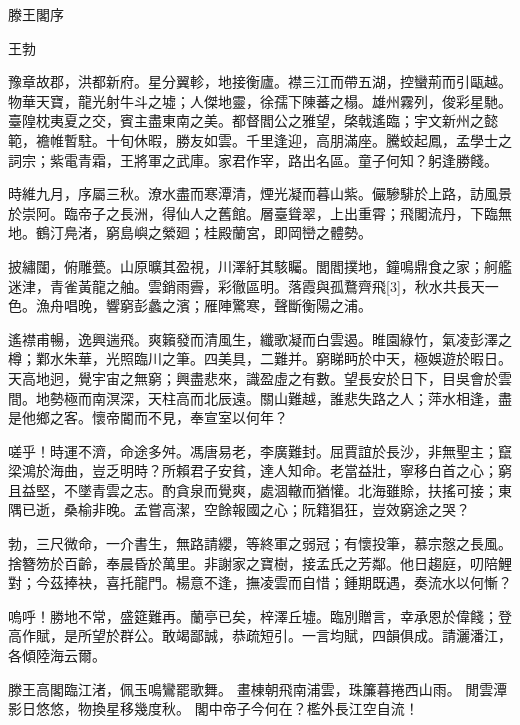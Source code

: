 滕王閣序

王勃

豫章故郡，洪都新府。星分翼軫，地接衡廬。襟三江而帶五湖，控蠻荊而引甌越。物華天寶，龍光射牛斗之墟；人傑地靈，徐孺下陳蕃之榻。雄州霧列，俊彩星馳。臺隍枕夷夏之交，賓主盡東南之美。都督閻公之雅望，棨戟遙臨；宇文新州之懿範，襜帷暫駐。十旬休暇，勝友如雲。千里逢迎，高朋滿座。騰蛟起鳳，孟學士之詞宗；紫電青霜，王將軍之武庫。家君作宰，路出名區。童子何知？躬逢勝餞。

時維九月，序屬三秋。潦水盡而寒潭清，煙光凝而暮山紫。儼驂騑於上路，訪風景於崇阿。臨帝子之長洲，得仙人之舊館。層臺聳翠，上出重霄；飛閣流丹，下臨無地。鶴汀鳧渚，窮島嶼之縈廻；桂殿蘭宮，即岡巒之體勢。

披繡闥，俯雕甍。山原曠其盈視，川澤紆其駭矚。閭閻撲地，鐘鳴鼎食之家；舸艦迷津，青雀黃龍之舳。雲銷雨霽，彩徹區明。落霞與孤鶩齊飛[3]，秋水共長天一色。漁舟唱晚，響窮彭蠡之濱；雁陣驚寒，聲斷衡陽之浦。

遙襟甫暢，逸興遄飛。爽籟發而清風生，纖歌凝而白雲遏。睢園綠竹，氣凌彭澤之樽；鄴水朱華，光照臨川之筆。四美具，二難并。窮睇眄於中天，極娛遊於暇日。天高地迥，覺宇宙之無窮；興盡悲來，識盈虛之有數。望長安於日下，目吳會於雲間。地勢極而南溟深，天柱高而北辰遠。關山難越，誰悲失路之人；萍水相逢，盡是他鄉之客。懷帝閽而不見，奉宣室以何年？

嗟乎！時運不濟，命途多舛。馮唐易老，李廣難封。屈賈誼於長沙，非無聖主；竄梁鴻於海曲，豈乏明時？所賴君子安貧，達人知命。老當益壯，寧移白首之心；窮且益堅，不墜青雲之志。酌貪泉而覺爽，處涸轍而猶懽。北海雖賒，扶搖可接；東隅已逝，桑榆非晚。孟嘗高潔，空餘報國之心；阮籍猖狂，豈效窮途之哭？

勃，三尺微命，一介書生，無路請纓，等終軍之弱冠；有懷投筆，慕宗慤之長風。捨簪笏於百齡，奉晨昏於萬里。非謝家之寶樹，接孟氏之芳鄰。他日趨庭，叨陪鯉對；今茲捧袂，喜托龍門。楊意不逢，撫凌雲而自惜；鍾期既遇，奏流水以何慚？

嗚呼！勝地不常，盛筵難再。蘭亭已矣，梓澤丘墟。臨別贈言，幸承恩於偉餞；登高作賦，是所望於群公。敢竭鄙誠，恭疏短引。一言均賦，四韻俱成。請灑潘江，各傾陸海云爾。

滕王高閣臨江渚，佩玉鳴鸞罷歌舞。
畫棟朝飛南浦雲，珠簾暮捲西山雨。
閒雲潭影日悠悠，物換星移幾度秋。
閣中帝子今何在？檻外長江空自流！